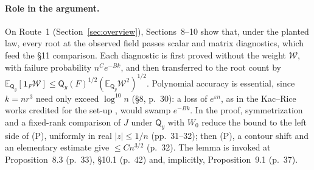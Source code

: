 \documentclass[11pt]{article}
\newcommand{\E}{\mathbb{E}}
\newcommand{\one}{\mathbf{1}}
\newcommand{\ploc}[2]{#1}
\begin{document}
\paragraph{Role in the argument.}
On Route~1 (Section~\ref{sec:overview}), Sections~8--10 show that, under
the planted law, every root at the observed field passes scalar and matrix
diagnostics, which feed the \S11 comparison. Each diagnostic is first proved
without the weight $\mathcal W$, with failure probability $n^Ce^{-Bk}$, and
then transferred to the root count by
$\E_{\mathsf Q_y}[\one_F\mathcal W]\le\mathsf Q_y(F)^{1/2}
(\E_{\mathsf Q_y}\mathcal W^2)^{1/2}$. Polynomial accuracy is essential, since
$k=nr^3$ need only exceed $\log^{10}n$
\ploc{(\S8, p.~30)}{profile-roots.tex:45}: a loss of $e^{\varepsilon n}$, as in
the Kac--Rice works credited for the set-up
\cite{FanMeiMontanari2018-TAPFreeEnergyVariationalInference,CelentanoFanMei2021-LocalConvexityTAPZ2Sync},
would swamp $e^{-Bk}$. In the proof, symmetrization and a fixed-rank
comparison of $J$ under $\mathsf Q_y$ with $W_0$ reduce the bound to the left
side of (P), uniformly in real $|z|\le1/n$
\ploc{(pp.~31--32)}{profile-roots.tex:104--150}; then (P), a contour shift and
an elementary estimate give $\le Cn^{3/2}$
\ploc{(p.~32)}{profile-roots.tex:152--191}. The lemma is invoked at
\ploc{Proposition~8.3 (p.~33)}{profile-roots.tex:238--244},
\ploc{\S10.1 (p.~42)}{profile-orbits.tex:29--33} and, implicitly,
\ploc{Proposition~9.1 (p.~37)}{profile-matrices.tex:60--61}.
\end{document}
